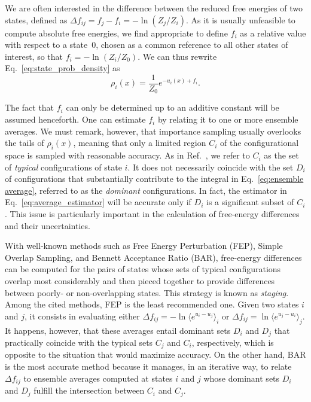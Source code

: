\documentclass[aip,jcp,reprint,amsmath,amssymb]{revtex4-1}
\begin{document}
We are often interested in the difference between the reduced free energies of two states, defined as $\Delta f_{ij} = f_j - f_i = - \ln (Z_j/Z_i)$. As it is usually unfeasible to compute absolute free energies, we find appropriate to define $f_i$ as a relative value with respect to a state~$0$, chosen as a common reference to all other states of interest, so that $f_i = -\ln (Z_i/Z_0)$. We can thus rewrite Eq.~\eqref{eq:state_prob_density} as
\begin{equation}
\label{eq:state_prob_density_Z0}
\rho_i(x) = \frac{1}{Z_0} e^{-u_i(x)+ f_i}.
\end{equation}

The fact that $f_i$ can only be determined up to an additive constant will be assumed henceforth. One can estimate $f_i$ by relating it to one or more ensemble averages. We must remark, however, that importance sampling usually overlooks the tails of $\rho_i(x)$, meaning that only a limited region $C_i$ of the configurational space is sampled with reasonable accuracy. As in Ref.~, we refer to $C_i$ as the set of \textit{typical} configurations of state $i$. It does not necessarily coincide with the set $D_i$ of configurations that substantially contribute to the integral in Eq.~\eqref{eq:ensemble average}, referred to as the \textit{dominant} configurations. In fact, the estimator in Eq.~\eqref{eq:average_estimator} will be accurate only if $D_i$ is a significant subset of $C_i$. This issue is particularly important in the calculation of free-energy differences and their uncertainties.

With well-known methods such as Free Energy Perturbation (FEP),\cite{Zwanzig_1954} Simple Overlap Sampling,\cite{Lee_1980, Lu_2003} and Bennett Acceptance Ratio (BAR),\cite{Bennett_1976} free-energy differences can be computed for the pairs of states whose sets of typical configurations overlap most considerably and then pieced together to provide differences between poorly- or non-overlapping states. This strategy is known as \textit{staging}.\cite{Kofke_1998} Among the cited methods, FEP is the least recommended one. Given two states $i$ and $j$, it consists in evaluating either $\Delta f_{ij} = -\ln \langle e^{u_i - u_j} \rangle_i$ or $\Delta f_{ij} = \ln \langle e^{u_j - u_i} \rangle_j$.\cite{Zwanzig_1954} It happens, however, that these averages entail dominant sets $D_i$ and $D_j$ that practically coincide with the typical sets $C_j$ and $C_i$, respectively, which is opposite to the situation that would maximize accuracy.\cite{Jarzynski_2006} On the other hand, BAR is the most accurate method because it manages, in an iterative way, to relate $\Delta f_{ij}$ to ensemble averages computed at states $i$ and $j$ whose dominant sets $D_i$ and $D_j$ fulfill the intersection between $C_i$ and $C_j$.
\end{document}
